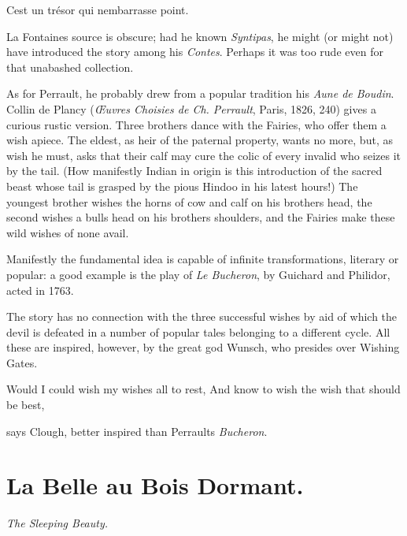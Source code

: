 \documentclass[14pt,a4paper]{memoir}
\newcommand{\notesection}[1]{%
  \addtonotes{\protect\par\protect\vspace{2ex}\protect\noindent\textbf{#1}\protect\par\protect\vspace{1ex}}%
}
\begin{document}
{{\textquotesingle C\textquotesingle est un trésor qui
n\textquotesingle embarrasse point.\textquotesingle{}}

La Fontaine\textquotesingle s source is obscure; had he known
\emph{Syntipas}, he might (or might not) have introduced the story among
his \emph{Contes}. Perhaps it was too rude even for that unabashed
collection.

As for Perrault, he probably drew from a popular tradition his
\emph{Aune de Boudin}. Collin de Plancy (\emph{Œuvres Choisies de Ch.
Perrault}, Paris, 1826, 240) gives a curious rustic version. Three
brothers dance with the Fairies, who offer them a wish apiece. The
eldest, as heir of the paternal property, wants no more, but, as wish he
must, asks that their calf may cure the colic of every invalid who
seizes it by the tail. (How manifestly Indian in origin is this
introduction of the sacred beast whose tail is grasped by the pious
Hindoo in his latest hours!) The youngest brother wishes the horns of
cow and calf on his brother\textquotesingle s head, the second wishes a
bull\textquotesingle s head on his brother\textquotesingle s shoulders,
and the Fairies make these wild wishes of none avail.

Manifestly the fundamental idea is capable of infinite transformations,
literary or popular: a good example is the play of \emph{Le Bucheron},
by Guichard and Philidor, acted in 1763.

The story has no connection with the three successful wishes by aid of
which the devil is defeated in a number of popular tales belonging to a
different cycle. All these are inspired, however, by the great god
Wunsch, who presides over Wishing Gates.

{\textquotesingle Would I could wish my wishes all to rest,} {And know
to wish the wish that should be best,}

says Clough, better inspired than Perrault\textquotesingle s
\emph{Bucheron}.

\section{La Belle au Bois Dormant.}
\notesection{La Belle au Bois Dormant.}

\emph{The Sleeping Beauty.} \\

}
\end{document}
